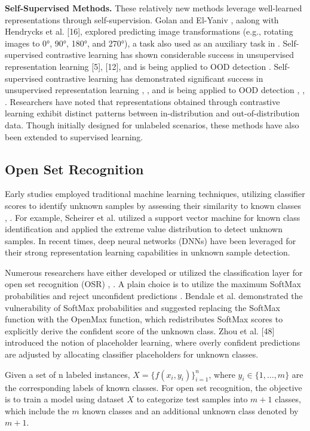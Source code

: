 \documentclass{gji}
\begin{document}
\textbf{Self-Supervised Methods.} These relatively new methods leverage well-learned representations through self-supervision. Golan and El-Yaniv \cite{11}, aalong with Hendrycks et al. [16], explored predicting image transformations (e.g., rotating images to 0°, 90°, 180°, and 270°), a task also used as an auxiliary task in \cite{38}. Self-supervised contrastive learning has
shown considerable success in unsupervised representation learning [5], [12], and is being applied to OOD detection \cite {38}. Self-supervised contrastive learning has demonstrated significant success in unsupervised representation learning \cite {5}, \cite {12}, and is being applied to OOD detection \cite {35}, \cite {38}, \cite {41}. Researchers have noted that representations obtained through contrastive learning exhibit distinct patterns between in-distribution and out-of-distribution data. Though initially designed for unlabeled scenarios, these methods have also been extended to supervised learning.

  
\subsection{Open Set Recognition}

Early studies employed traditional machine learning techniques, utilizing classifier scores to identify unknown samples by assessing their similarity to known classes \cite {1},  \cite {18}. For example, Scheirer et al. \cite {34} utilized a support vector machine for known class identification and applied the extreme value distribution to detect unknown samples. In recent times, deep neural networks (DNNs) have been leveraged for their strong representation learning capabilities in unknown sample detection. 

Numerous researchers have either developed or utilized the classification layer for open set recognition (OSR) \cite {15}, \cite {48}. A plain choice is to utilize the maximum SoftMax probabilities and reject unconfident predictions \cite {15}. Bendale et al. \cite {2} demonstrated the vulnerability of SoftMax probabilities and suggested replacing the SoftMax function with the OpenMax function, which redistributes SoftMax scores to explicitly derive the confident score of the unknown class. Zhou et al. [48] introduced the notion of placeholder learning, where overly confident predictions are adjusted by allocating classifier placeholders for unknown classes.

Given a set of n labeled instances, $X = \{f(x_i, y_i)\}_{i=1}^n$, where $y_i \in \{1, \ldots, m\}$ are the corresponding labels of known classes. 
For open set recognition, the objective is to train a model using dataset $X$ to categorize test samples into $m + 1$ classes, which include the $m$ known classes and an additional unknown class denoted by $m + 1$.
\end{document}
